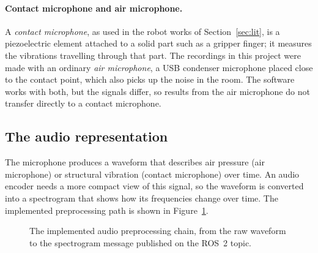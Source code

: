 \documentclass[
  english,
  accentcolor=11b,
  type=intern,
  marginpar=false,
  logofile=figures/PEARLTUDA.png
]{tudapub}
\begin{document}
\paragraph{Contact microphone and air microphone.} A \emph{contact microphone}, as used in the robot works of Section~\ref{sec:lit}, is a piezoelectric element attached to a solid part such as a gripper finger; it measures the vibrations travelling through that part. The recordings in this project were made with an ordinary \emph{air microphone}, a USB condenser microphone placed close to the contact point, which also picks up the noise in the room. The software works with both, but the signals differ, so results from the air microphone do not transfer directly to a contact microphone.

\subsection{The audio representation}

The microphone produces a waveform that describes air pressure (air microphone) or structural vibration (contact microphone) over time. An audio encoder needs a more compact view of this signal, so the waveform is converted into a spectrogram that shows how its frequencies change over time. The implemented preprocessing path is shown in Figure~\ref{fig:audio-chain}.

\begin{figure}[htbp]
  \centering
  \caption{The implemented audio preprocessing chain, from the raw waveform to the spectrogram message published on the ROS~2 topic.}
  \label{fig:audio-chain}
\end{figure}
\end{document}

